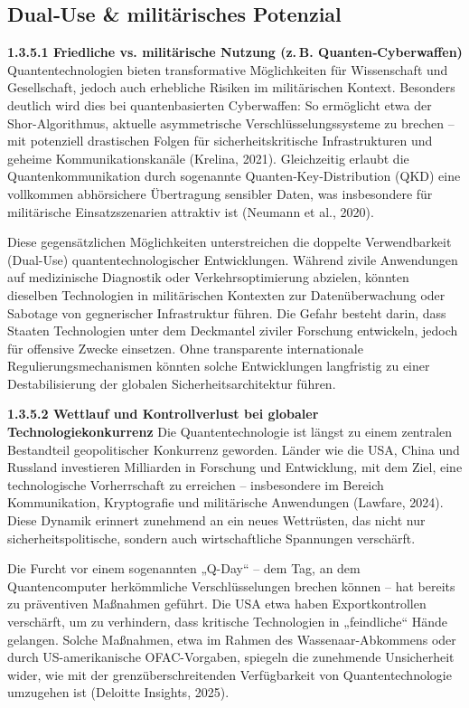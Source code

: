 \subsection{Dual‑Use & militärisches Potenzial}
\textbf{1.3.5.1 \textbf{Friedliche vs. militärische Nutzung (z. B. Quanten‑Cyberwaffen)} }
Quantentechnologien bieten transformative Möglichkeiten für Wissenschaft und Gesellschaft, jedoch auch erhebliche Risiken im militärischen Kontext. Besonders deutlich wird dies bei quantenbasierten Cyberwaffen: So ermöglicht etwa der Shor-Algorithmus, aktuelle asymmetrische Verschlüsselungssysteme zu brechen – mit potenziell drastischen Folgen für sicherheitskritische Infrastrukturen und geheime Kommunikationskanäle (Krelina, 2021). Gleichzeitig erlaubt die Quantenkommunikation durch sogenannte Quanten‑Key‑Distribution (QKD) eine vollkommen abhörsichere Übertragung sensibler Daten, was insbesondere für militärische Einsatzszenarien attraktiv ist (Neumann et al., 2020).

Diese gegensätzlichen Möglichkeiten unterstreichen die doppelte Verwendbarkeit (Dual-Use) quantentechnologischer Entwicklungen. Während zivile Anwendungen auf medizinische Diagnostik oder Verkehrsoptimierung abzielen, könnten dieselben Technologien in militärischen Kontexten zur Datenüberwachung oder Sabotage von gegnerischer Infrastruktur führen. Die Gefahr besteht darin, dass Staaten Technologien unter dem Deckmantel ziviler Forschung entwickeln, jedoch für offensive Zwecke einsetzen. Ohne transparente internationale Regulierungsmechanismen könnten solche Entwicklungen langfristig zu einer Destabilisierung der globalen Sicherheitsarchitektur führen.

\textbf{ 1.3.5.2 Wettlauf und Kontrollverlust bei globaler Technologiekonkurrenz} 
Die Quantentechnologie ist längst zu einem zentralen Bestandteil geopolitischer Konkurrenz geworden. Länder wie die USA, China und Russland investieren Milliarden in Forschung und Entwicklung, mit dem Ziel, eine technologische Vorherrschaft zu erreichen – insbesondere im Bereich Kommunikation, Kryptografie und militärische Anwendungen (Lawfare, 2024). Diese Dynamik erinnert zunehmend an ein neues Wettrüsten, das nicht nur sicherheitspolitische, sondern auch wirtschaftliche Spannungen verschärft.

Die Furcht vor einem sogenannten „Q-Day“ – dem Tag, an dem Quantencomputer herkömmliche Verschlüsselungen brechen können – hat bereits zu präventiven Maßnahmen geführt. Die USA etwa haben Exportkontrollen verschärft, um zu verhindern, dass kritische Technologien in „feindliche“ Hände gelangen. Solche Maßnahmen, etwa im Rahmen des Wassenaar-Abkommens oder durch US-amerikanische OFAC-Vorgaben, spiegeln die zunehmende Unsicherheit wider, wie mit der grenzüberschreitenden Verfügbarkeit von Quantentechnologie umzugehen ist (Deloitte Insights, 2025).

